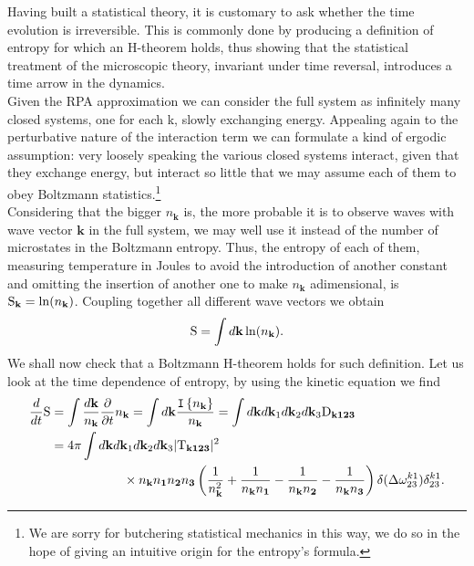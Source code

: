 Having built a statistical theory, it is customary to ask whether the time evolution is irreversible. This is commonly done by producing a definition of entropy for which
an H-theorem holds, thus showing that the statistical treatment of the microscopic theory, invariant under time reversal, introduces a time arrow in the dynamics. \\
Given the RPA approximation we can consider the full system as infinitely many closed systems, one for each k, slowly exchanging energy. Appealing again to 
the perturbative nature of the interaction term we can formulate a kind of ergodic assumption: very loosely speaking the various closed systems interact, given that they exchange energy, but interact 
so little that we may assume each of them to obey Boltzmann statistics.\footnote{We are sorry for butchering statistical mechanics in this way, 
we do so in the hope of giving an intuitive origin for the entropy's formula.}\\ 
Considering that the bigger $n_\mathbf{k}$ is, the more probable it is to observe waves with wave vector $\mathbf{k}$ in the full system, 
we may well use it instead of the number 
of microstates in the Boltzmann entropy. Thus, the entropy of each of them, measuring temperature in Joules to avoid the introduction of another constant
and omitting the insertion of another one to make $n_\mathbf{k}$ adimensional, is $\mathrm{S}_\mathbf{k} = \ln(n_\mathbf{k})$. 
Coupling together all different wave vectors we obtain 
\begin{equation}
    \mathrm{S} = \int d\mathbf{k} \ln(n_\mathbf{k}).
\end{equation}
We shall now check that a Boltzmann H-theorem holds for such definition. Let us look at the time dependence of entropy, by using the kinetic equation we find
\begin{align}
    \frac{d}{dt} \mathrm{S} &= \int \frac{d\mathbf{k}}{n_\mathbf{k}} \frac{\partial}{\partial t} n_\mathbf{k} = \int d\mathbf{k} \frac{\mathtt{I}\left\{n_\mathbf{k}\right\}}{n_\mathbf{k}} = 
    \int d\mathbf{k} d\mathbf{k}_1 d\mathbf{k}_2 d\mathbf{k}_3 \mathrm{D}_\mathbf{k123}\\
    &= 4\pi \int d\mathbf{k} d\mathbf{k}_1 d\mathbf{k}_2 d\mathbf{k}_3 |\mathrm{T}_{\mathbf{k123}}|^2 \\
    &\hspace{2cm}\times n_\mathbf{k}n_\mathbf{1}n_\mathbf{2}n_\mathbf{3} 
     \left(\frac{1}{n_\mathbf{k}^2} + \frac{1}{n_\mathbf{k} n_\mathbf{1}}-\frac{1}{n_\mathbf{k} n_\mathbf{2}}-\frac{1}{n_\mathbf{k} n_\mathbf{3}}\right)
    \delta(\Delta{\omega}^{k1}_{23})\delta^{k1}_{23}.
\end{align}
